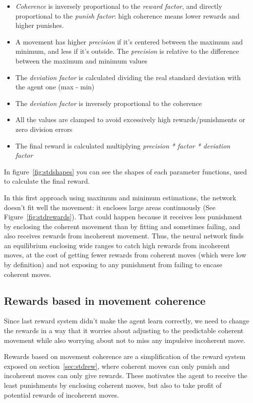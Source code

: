 \begin{itemize}
 \item \emph{Coherence} is inversely proportional to the \emph{reward factor}, and directly proportional to the \emph{punish factor}: high coherence means lower rewards and higher punishes.
 \item A movement has higher \emph{precision} if it's centered between the maximum and minimum, and less if it's outside. The \emph{precision} is relative to the difference between the maximum and minimum values
 \item The \emph{deviation factor} is calculated dividing the real standard deviation with the agent one (max - min)
 \item The \emph{deviation factor} is inversely proportional to the coherence
 \item All the values are clamped to avoid excessively high rewards/punishments or zero division errors
 \item The final reward is calculated multiplying \emph{precision * factor * deviation factor}
\end{itemize}

In figure~\ref{fig:stdshapes} you can see the shapes of each parameter functions, used to calculate the final reward.


In this first approach using maximum and minimum estimations, the network doesn't fit well the movement: it encloses large areas continuously (See Figure~\ref{fig:stdrewards}). That could happen because it receives less punishment by enclosing the coherent movement than by fitting and sometimes failing, and also receives rewards from incoherent movement. Thus, the neural network finds an equilibrium enclosing wide ranges to catch high rewards from incoherent moves, at the cost of getting fewer rewards from coherent moves (which were low by definition) and not exposing to any punishment from failing to encase coherent moves.

\subsection{Rewards based in movement coherence}
\label{sec:cohrew}

Since last reward system didn't make the agent learn correctly, we need to change the rewards in a way that it worries about adjusting to the predictable coherent movement while also worrying about not to miss any impulsive incoherent move.

Rewards based on movement coherence are a simplification of the reward system exposed on section~\ref{sec:stdrew}, where coherent moves can only punish and incoherent moves can only give rewards. These motivates the agent to receive the least punishments by enclosing coherent moves, but also to take profit of potential rewards of incoherent moves. 

